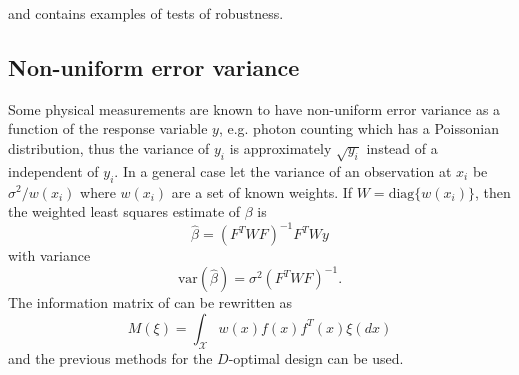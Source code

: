 \documentclass[12pt]{iopart}
\begin{document}
 and  contains examples of tests of robustness.

\subsection{Non-uniform error variance}

Some physical measurements are known to have non-uniform error variance as a function of the response variable $y$, e.g. photon counting which has a Poissonian distribution, thus the variance of $y_i$ is approximately $\sqrt{y_i}$ instead of a independent of $y_i$. In a general case let the variance of an observation at $x_i$ be $\sigma^2/w(x_i)$ where $w(x_i)$ are a set of known weights. If $W = \mathrm{diag}\{w(x_i)\}$, then the weighted least squares estimate of $\beta$ is
\begin{equation}
\hat \beta = (F^T W F)^{-1} F^T W y
\end{equation}
with variance
\begin{equation}
\mathrm{var}(\hat \beta) = \sigma^2 (F^T W F)^{-1}.
\end{equation}
The information matrix of  can be rewritten as
\begin{equation}
M(\xi) = \int_{\mathcal{X}} w(x) f(x)f^T(x) \xi(dx)
\end{equation}
and the previous methods for the $D$-optimal design can be used.
\end{document}
